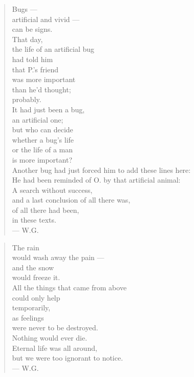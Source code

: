 \begin{quote}
Bugs --- \\
artificial and vivid --- \\
can be signs. \\
That day, \\
the life of an artificial bug \\
had told him \\
that P.'s friend \\
was more important \\
than he'd thought; \\
probably. \\
It had just been a bug, \\
an artificial one; \\
but who can decide \\
whether a bug's life \\
or the life of a man \\
is more important? \\
Another bug had just forced him to add these lines here: \\
He had been reminded of O. by that artificial animal: \\
A search without success, \\
and a last conclusion of all there was, \\
of all there had been, \\
in these texts. \\
--- W.G.
\end{quote}

\begin{quote}
The rain \\
would wash away the pain --- \\
and the snow \\
would freeze it. \\
All the things that came from above \\
could only help \\
temporarily, \\
as feelings \\
were never to be destroyed. \\
Nothing would ever die. \\
Eternal life was all around, \\
but we were too ignorant to notice. \\
--- W.G.
\end{quote}

